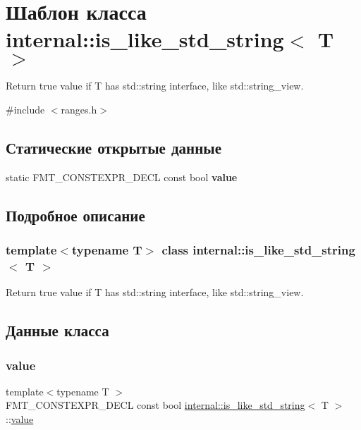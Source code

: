 \hypertarget{classinternal_1_1is__like__std__string}{}\section{Шаблон класса internal\+:\+:is\+\_\+like\+\_\+std\+\_\+string$<$ T $>$}
\label{classinternal_1_1is__like__std__string}


Return true value if T has std\+::string interface, like std\+::string\+\_\+view.  




{\ttfamily \#include $<$ranges.\+h$>$}

\subsection*{Статические открытые данные}
\begin{DoxyCompactItemize}
\item 
static F\+M\+T\+\_\+\+C\+O\+N\+S\+T\+E\+X\+P\+R\+\_\+\+D\+E\+CL const bool {\bfseries value}
\end{DoxyCompactItemize}


\subsection{Подробное описание}
\subsubsection*{template$<$typename T$>$\newline
class internal\+::is\+\_\+like\+\_\+std\+\_\+string$<$ T $>$}

Return true value if T has std\+::string interface, like std\+::string\+\_\+view. 

\subsection{Данные класса}
\mbox{\label{classinternal_1_1is__like__std__string_a669d29cac2e005cbe132b885f482cdbf}} 
\subsubsection{\texorpdfstring{value}{value}}
{\footnotesize\ttfamily template$<$typename T $>$ \\
F\+M\+T\+\_\+\+C\+O\+N\+S\+T\+E\+X\+P\+R\+\_\+\+D\+E\+CL const bool \hyperlink{classinternal_1_1is__like__std__string}{internal\+::is\+\_\+like\+\_\+std\+\_\+string}$<$ T $>$\+::\hyperlink{classinternal_1_1value}{value}\hspace{0.3cm}{\ttfamily [static]}}

